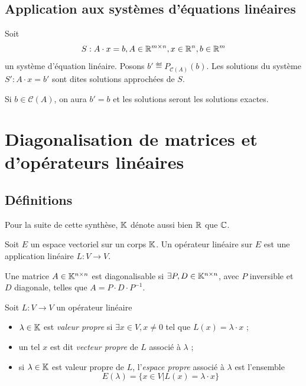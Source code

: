 \subsection{Application aux systèmes d'équations linéaires}
Soit
\[ S : A \cdot x = b, A \in \mathbb{R}^{m \times n}, x \in \mathbb{R}^n, b \in \mathbb{R}^m \]
un système d'équation linéaire.
Posons $b' \eqdef P_{\mathcal{C}(A)}(b)$.
Les solutions du système $S' : A \cdot x = b'$ sont dites solutions approchées de $S$.

Si $b \in \mathcal{C}(A)$, on aura $b' = b$ et les solutions seront les solutions exactes.


\section{Diagonalisation de matrices et d'opérateurs linéaires}

\subsection{Définitions}

\begin{mynota}
	Pour la suite de cette synthèse, $\mathbb{K}$ dénote aussi bien $\mathbb{R}$ que $\mathbb{C}$.
\end{mynota}

\begin{mydef}
	Soit $E$ un espace vectoriel sur un corps $\mathbb{K}$.
	Un opérateur linéaire sur $E$ est une application linéaire $L: V \to V$.
\end{mydef}

\begin{mydef}
	Une matrice $A \in \mathbb{K}^{n \times n}$ est diagonalisable si $\exists P, D \in \mathbb{K}^{n \times n}$, avec $P$ inversible et $D$ diagonale, telles que $A = P \cdot D \cdot P^{-1}$.
\end{mydef}

\begin{mydef} Soit $L : V \rightarrow V$ un opérateur linéaire
	\begin{itemize}
		\item $\lambda \in \mathbb{K}$ est \emph{valeur propre} si $\exists x \in V, x \neq 0$ tel que $L(x) = \lambda \cdot x$ ;
		\item un tel $x$ est dit \emph{vecteur propre} de $L$ associé à $\lambda$ ;
		\item si $\lambda \in \mathbb{K}$ est valeur propre de $L$, l'\emph{espace propre} associé à $\lambda$ est l'ensemble
			\[ E(\lambda) = \{ x \in V | L(x) = \lambda \cdot x \} \]
	\end{itemize}
\end{mydef}

